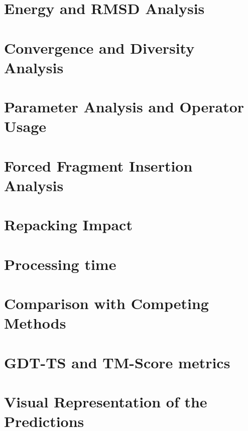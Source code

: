 \section{Energy and \ac{RMSD} Analysis}\label{sec:methods-analysis}







\section{Convergence and Diversity Analysis}

\section{Parameter Analysis and Operator Usage}

\section{Forced Fragment Insertion Analysis}

\section{Repacking Impact}

\section{Processing time}

\section{Comparison with Competing Methods}



\section{GDT-TS and TM-Score metrics}

\section{Visual Representation of the Predictions}

